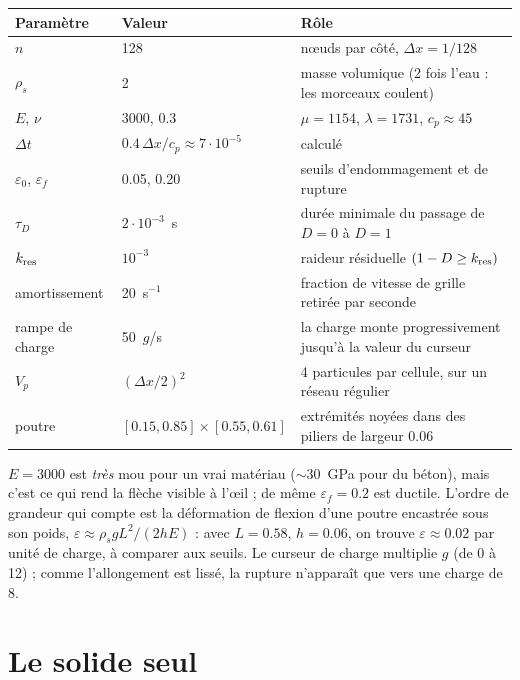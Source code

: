 \documentclass[11pt,a4paper]{article}
\begin{document}
\begin{center}
\begin{tabular}{@{}lll@{}}
\toprule
Paramètre & Valeur & Rôle \\
\midrule
$n$ & 128 & n\oe uds par côté, $\Delta x = 1/128$ \\
$\rho_s$ & 2 & masse volumique (2 fois l'eau : les morceaux coulent) \\
$E$, $\nu$ & 3000, 0.3 & $\mu = 1154$, $\lambda = 1731$, $c_p \approx 45$ \\
$\Delta t$ & $0.4\,\Delta x/c_p \approx 7\cdot10^{-5}$ & calculé \\
$\varepsilon_0$, $\varepsilon_f$ & 0.05, 0.20 & seuils d'endommagement et de rupture \\
$\tau_D$ & $2\cdot10^{-3}$~s & durée minimale du passage de $D=0$ à $D=1$ \\
$k_{\rm res}$ & $10^{-3}$ & raideur résiduelle $(1-D \ge k_{\rm res})$ \\
amortissement & 20~s$^{-1}$ & fraction de vitesse de grille retirée par seconde \\
rampe de charge & 50~$g$/s & la charge monte progressivement jusqu'à la valeur du curseur \\
$V_p$ & $(\Delta x/2)^2$ & 4 particules par cellule, sur un réseau régulier \\
poutre & $[0.15, 0.85]\times[0.55, 0.61]$ & extrémités noyées dans des piliers de largeur 0.06 \\
\bottomrule
\end{tabular}
\end{center}

$E = 3000$ est \emph{très} mou pour un vrai matériau ($\sim 30$~GPa pour du béton), mais c'est ce
qui rend la flèche visible à l'\oe il ; de même $\varepsilon_f = 0.2$ est ductile. L'ordre de
grandeur qui compte est la déformation de flexion d'une poutre encastrée sous son poids,
$\varepsilon \approx \rho_s g L^2 / (2 h E)$ : avec $L = 0.58$, $h = 0.06$, on trouve
$\varepsilon \approx 0.02$ par unité de charge, à comparer aux seuils. Le curseur de charge
multiplie $g$ (de 0 à 12) ; comme l'allongement est lissé, la rupture n'apparaît que vers une
charge de 8.

\part{Le solide seul}

\end{document}
